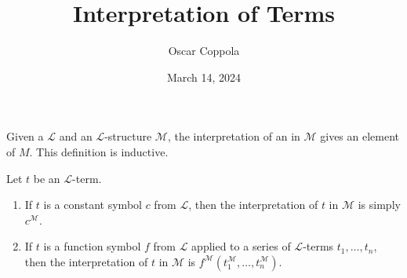 \documentclass[a4paper]{article}
\title{Interpretation of Terms}
\date{March 14, 2024}
\author{Oscar Coppola}
\begin{document}
\maketitle
\par{
    Given a  \(\mathcal  L\) and an \(\mathcal  L\)-structure \(\mathcal  M\),
    the interpretation of an  in \(\mathcal  M\) gives an element of \(M\).
    This definition is inductive.
}\par{
    Let \(t\) be an \(\mathcal  L\)-term.
    \begin{enumerate}
\item{
            If \(t\) is a constant symbol \(c\) from \(\mathcal  L\),
            then the interpretation of \(t\) in \(\mathcal  M\) is simply \(c^{ \mathcal  M}\).
        }
        \item{
            If \(t\) is a function symbol \(f\) from \(\mathcal  L\) applied to a series of
            \(\mathcal  L\)-terms \(t_1, \dots ,t_n\), then the interpretation of \(t\) in \(\mathcal  M\) is
            \(f^{ \mathcal  M}(t_1^{ \mathcal  M}, \dots ,t_n^{ \mathcal  M})\).
        }
\end{enumerate}}
\printbibliography
\end{document}
